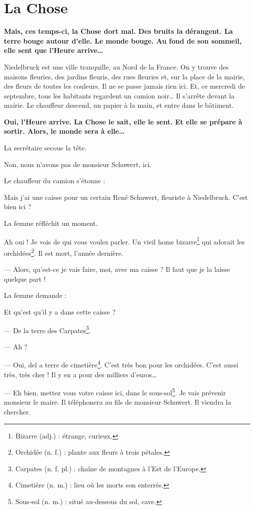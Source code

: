 \chapter{La Chose}
\textbf{Mais, ces temps-ci, la Chose dort mal. Des bruits la dérangent. La terre bouge autour d'elle. Le monde bouge. Au fond de
son sommeil, elle sent que l'Heure arrive\ldots{}}

Niedelbruck est une ville tranquille, au Nord de la France. On y trouve des maisons fleuries, des jardins fleuris,
des rues fleuries et, sur la place de la mairie, des fleurs de toutes les couleurs. Il ne se passe jamais rien ici.
Et, ce mercredi de septembre, tous les habitants regardent un camion noir\ldots{} Il s'arrête devant la mairie. Le
chauffeur descend, un papier à la main, et entre dans le bâtiment.

\textbf{Oui, l'Heure arrive. La Chose le sait, elle le sent. Et elle se prépare à sortir. Alors, le monde sera à elle\ldots{}}

La secrétaire secoue la tête.

\og{} Non, nous n'avons pas de monsieur Schuwert, ici. \fg{}

Le chauffeur du camion s'étonne :

\og{} Mais j'ai une caisse pour un certain René Schuwert, fleuriste à Niedelbruck. C'est bien ici ? \fg{}

La femme réfléchit un moment.

\og{} Ah oui ! Je vois de qui vous voulez parler. Un vieil home bizarre\footnote{Bizarre (adj.) : étrange, curieux.}
qui adorait les orchidées\footnote{Orchidée (n. f.) : plante aux fleurs à trois pétales.}. Il est mort, l'année
dernière.

--- Alors, qu'est-ce je vais faire, moi, avec ma caisse ? Il faut que je la laisse quelque part ! \fg{}

La femme demande :

\og Et qu'est qu'il y a dans cette caisse ?

--- De la terre des Carpates\footnote{Carpates (n. f. pl.) : chaîne de montagnes à l'Est de l'Europe.}.

--- Ah ?

--- Oui, del a terre de cimetière\footnote{Cimetière (n. m.) : lieu où les morts son enterrés.}. C'est très bon pour
    les orchidées. C'est aussi très, très cher ! Il y en a pour des milliers d'euros\ldots{}

--- Eh bien, mettez vous votre caisse ici, dans le sous-sol\footnote{Sous-sol (n. m.) : situé au-dessous du sol, cave.}.
    Je vais prévenir monsieur le maire. Il téléphonera au fils de monsieur Schuwert. Il viendra la chercher.

